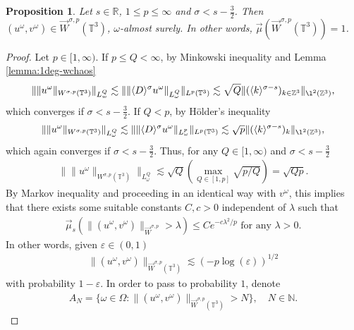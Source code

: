 \documentclass[a4paper, reqno, 11pt]{amsart}
\newtheorem{proposition}[theorem]{Proposition}
\theoremstyle{definition}
\begin{document}
\begin{proposition}\label{prop:asprop}
Let $s \in \mathbb{R}$, $1 \leq p \leq \infty$ and $\sigma < s - \frac{3}{2}$. Then $(u^{\omega},v^{\omega}) \in \vec{W}^{\sigma,p}(\mathbb{T}^3)$, $\omega$-almost surely. In other words, $\vec{\mu}(\vec{W}^{\sigma,p}(\mathbb{T}^3)) = 1$.
\end{proposition}
\begin{proof}
Let $p \in [1,\infty)$. If $p \leq Q < \infty$, by Minkowski inequality and Lemma \ref{lemma:1deg-wchaos}
\begin{align*}
\| \| u^{\omega} \|_{W^{\sigma,p}(\mathbb{T}^3)} \|_{L^Q_w} \lesssim \| \| \langle D \rangle^{\sigma} u^{\omega} \|_{L^Q_{\omega}} \|_{L^p(\mathbb{T}^3)} \lesssim \sqrt{Q} \| (\langle k \rangle^{\sigma - s})_{k \in \mathbb{Z}^3} \|_{\l^2(\mathbb{Z}^3)},
\end{align*}
which converges if $\sigma < s - \frac{3}{2}$. If $Q < p$, by Hölder's inequality
\begin{align*}
\| \| u^{\omega} \|_{W^{\sigma,p}(\mathbb{T}^3)} \|_{L^Q_{\omega}} \lesssim \| \| \langle D \rangle^{\sigma} u^{\omega} \|_{L^p_{\omega}} \|_{L^p(\mathbb{T}^3)} \lesssim \sqrt{p} \| (\langle k \rangle^{\sigma - s})_{k} \|_{\l^2(\mathbb{Z}^3)},
\end{align*}
which again converges if $\sigma < s - \frac{3}{2}$. Thus, for any $Q \in [1,\infty)$ and $\sigma < s - \frac{3}{2}$
\begin{align*}
\| \| u^{\omega} \|_{W^{\sigma,p}(\mathbb{T}^3)} \|_{L^Q_{\omega}} \lesssim \sqrt{Q} \left(\max_{Q \in [1,p]} \sqrt{p/Q}\right) = \sqrt{Qp}.
\end{align*}
By Markov inequality and proceeding in an identical way with $v^{\omega}$, this implies that there exists some suitable constants $C,c>0$ independent of $\lambda$ such that
\begin{align*}
\vec{\mu}_s(\|(u^{\omega},v^{\omega})\|_{\vec{W}^{\sigma,p}} > \lambda) \leq C e^{-c\lambda^2/p} \text{ for any } \lambda > 0.
\end{align*}
In other words, given $\varepsilon \in (0,1)$
\begin{align*}
\| (u^{\omega},v^{\omega}) \|_{\vec{W}^{\sigma,p}(\mathbb{T}^3)} \lesssim (-p\log(\varepsilon))^{1/2}
\end{align*}
with probability $1 - \varepsilon$. In order to pass to probability $1$, denote
\begin{align*}
A_N = \{\omega \in \Omega : \| (u^{\omega},v^{\omega}) \|_{\vec{W}^{\sigma,p}(\mathbb{T}^3)}> N\}, \quad N \in \mathbb{N}.

\end{align*}
\end{proof}
\end{document}
